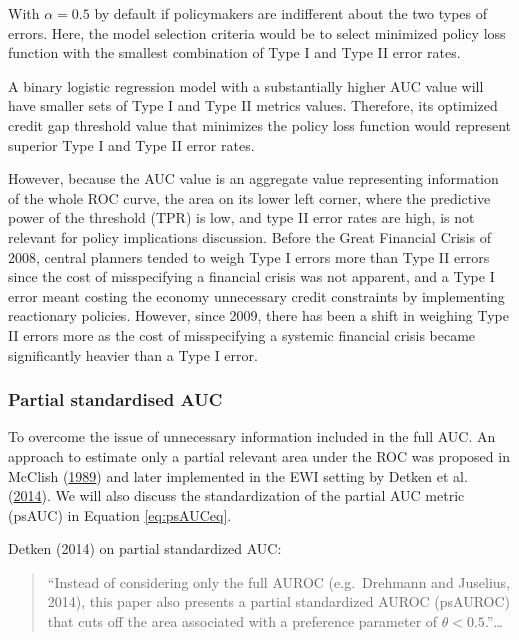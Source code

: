 \documentclass[
  12pt,
]{article}
\begin{document}
With \(\alpha = 0.5\) by default if policymakers are indifferent about the two types of errors. Here, the model selection criteria would be to select minimized policy loss function with the smallest combination of Type I and Type II error rates.

A binary logistic regression model with a substantially higher AUC value will have smaller sets of Type I and Type II metrics values. Therefore, its optimized credit gap threshold value that minimizes the policy loss function would represent superior Type I and Type II error rates.

However, because the AUC value is an aggregate value representing information of the whole ROC curve, the area on its lower left corner, where the predictive power of the threshold (TPR) is low, and type II error rates are high, is not relevant for policy implications discussion. Before the Great Financial Crisis of 2008, central planners tended to weigh Type I errors more than Type II errors since the cost of misspecifying a financial crisis was not apparent, and a Type I error meant costing the economy unnecessary credit constraints by implementing reactionary policies. However, since 2009, there has been a shift in weighing Type II errors more as the cost of misspecifying a systemic financial crisis became significantly heavier than a Type I error.

\hypertarget{psAUC}{%
\subsubsection{Partial standardised AUC}\label{psAUC}}

To overcome the issue of unnecessary information included in the full AUC. An approach to estimate only a partial relevant area under the ROC was proposed in McClish (\protect\hyperlink{ref-mcclish_analyzing_1989}{1989}) and later implemented in the EWI setting by Detken et al. (\protect\hyperlink{ref-detken_operationalising_2014}{2014}). We will also discuss the standardization of the partial AUC metric (psAUC) in Equation \eqref{eq:psAUCeq}.

Detken (2014) on partial standardized AUC:

\begin{quote}
``Instead of considering only the full AUROC (e.g.~Drehmann and Juselius, 2014), this paper also presents a partial standardized AUROC (psAUROC) that cuts off the area associated with a preference parameter of \(\theta<0.5\).''\ldots{}
\end{quote}
\end{document}
